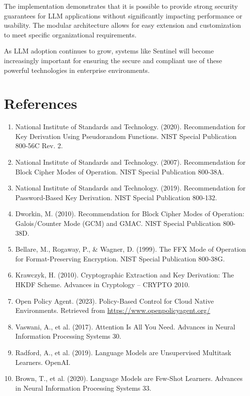 \documentclass[12pt]{article}
\begin{document}
The implementation demonstrates that it is possible to provide strong security guarantees for LLM applications without significantly impacting performance or usability. The modular architecture allows for easy extension and customization to meet specific organizational requirements.

As LLM adoption continues to grow, systems like Sentinel will become increasingly important for ensuring the secure and compliant use of these powerful technologies in enterprise environments.

\section{References}

\begin{enumerate}
    \item National Institute of Standards and Technology. (2020). Recommendation for Key Derivation Using Pseudorandom Functions. NIST Special Publication 800-56C Rev. 2.
    
    \item National Institute of Standards and Technology. (2007). Recommendation for Block Cipher Modes of Operation. NIST Special Publication 800-38A.
    
    \item National Institute of Standards and Technology. (2019). Recommendation for Password-Based Key Derivation. NIST Special Publication 800-132.
    
    \item Dworkin, M. (2010). Recommendation for Block Cipher Modes of Operation: Galois/Counter Mode (GCM) and GMAC. NIST Special Publication 800-38D.
    
    \item Bellare, M., Rogaway, P., \& Wagner, D. (1999). The FFX Mode of Operation for Format-Preserving Encryption. NIST Special Publication 800-38G.
    
    \item Krawczyk, H. (2010). Cryptographic Extraction and Key Derivation: The HKDF Scheme. Advances in Cryptology – CRYPTO 2010.
    
    \item Open Policy Agent. (2023). Policy-Based Control for Cloud Native Environments. Retrieved from \url{https://www.openpolicyagent.org/}
    
    \item Vaswani, A., et al. (2017). Attention Is All You Need. Advances in Neural Information Processing Systems 30.
    
    \item Radford, A., et al. (2019). Language Models are Unsupervised Multitask Learners. OpenAI.
    
    \item Brown, T., et al. (2020). Language Models are Few-Shot Learners. Advances in Neural Information Processing Systems 33.
\end{enumerate}
\end{document}
